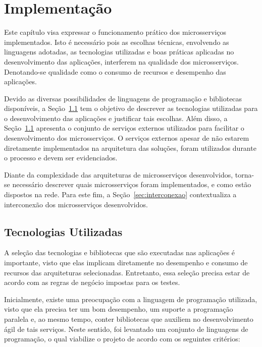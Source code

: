 \chapter{Implementação}
\label{cap5}



Este capítulo visa expressar o funcionamento prático dos microsserviços implementados.
%
Isto é necessário pois as escolhas técnicas, envolvendo as linguagens adotadas, as tecnologias utilizadas e boas práticas aplicadas no desenvolvimento das aplicações, interferem na qualidade dos microsserviços.
%
Denotando-se qualidade como o consumo de recursos e desempenho das aplicações.





Devido as diversas possibilidades de linguagens de programação e bibliotecas disponíveis, a Seção~\ref{sec:tecnologias} tem o objetivo de descrever as tecnologias utilizadas para o desenvolvimento das aplicações e justificar tais escolhas.
%
Além disso, a Seção~\ref{sec:tecnologias} apresenta o conjunto de serviços externos utilizados para facilitar o desenvolvimento dos microsserviços.
%
O serviços externos apesar de não estarem diretamente implementados na arquitetura das soluções, foram utilizados durante o processo e devem ser evidenciados.



Diante da complexidade das arquiteturas de microsserviços desenvolvidos, torna-se necessário descrever quais microsserviços foram implementados, e como estão dispostos na rede.
%
Para este fim, a Seção~\ref{sec:interconexao} contextualiza a interconexão dos microsserviços desenvolvidos.



\section{Tecnologias Utilizadas}
\label{sec:tecnologias}



A seleção das tecnologias e bibliotecas que são executadas nas aplicações é importante, visto que elas implicam diretamente no desempenho e consumo de recursos das arquiteturas selecionadas.
%
Entretanto, essa seleção precisa estar de acordo com as regras de negócio impostas para os testes.



Inicialmente, existe uma preocupação com a linguagem de programação utilizada, visto que ela precisa ter um bom desempenho, um suporte a programação paralela e, ao mesmo tempo, conter bibliotecas que auxiliem no desenvolvimento ágil de tais serviços.
%
Neste sentido, foi levantado um conjunto de linguagens de programação, o qual viabilize o projeto de acordo com os seguintes critérios:



